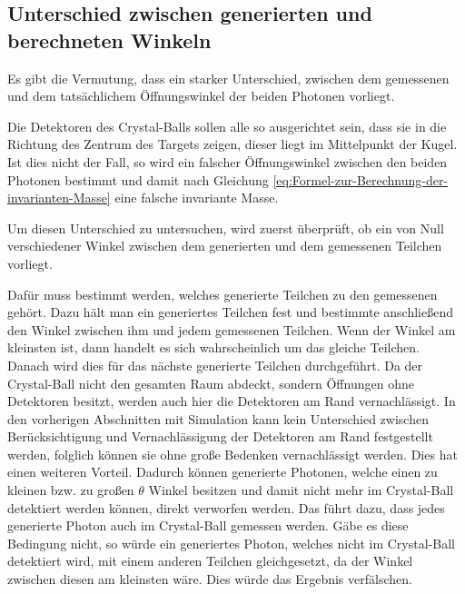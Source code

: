 \documentclass[a4paper,11pt,oneside,final,german,openbib,pdftex]{scrbook}
\begin{document}
{%




\subsection{Unterschied zwischen generierten und berechneten Winkeln}
\label{sec:Unterschied-tatsaechlicher-gemessener-Winkel}

Es gibt die Vermutung, dass ein starker Unterschied, zwischen dem gemessenen und dem tatsächlichem Öffnungswinkel der beiden Photonen vorliegt.

Die Detektoren des Crystal-Balls sollen alle so ausgerichtet sein, dass sie in die Richtung des Zentrum des Targets zeigen, dieser liegt im Mittelpunkt der Kugel. Ist dies nicht der Fall, so wird ein falscher Öffnungswinkel zwischen den beiden Photonen bestimmt und damit nach Gleichung \ref{eq:Formel-zur-Berechnung-der-invarianten-Masse} eine falsche invariante Masse.

Um diesen Unterschied zu untersuchen, wird zuerst überprüft, ob ein von Null verschiedener Winkel zwischen dem generierten und dem gemessenen Teilchen vorliegt.

Dafür muss bestimmt werden, welches generierte Teilchen zu den gemessenen gehört. Dazu h\"alt man ein generiertes Teilchen fest und bestimmte anschließend den Winkel zwischen ihm und jedem gemessenen Teilchen. Wenn der Winkel am kleinsten ist, dann handelt es sich wahrscheinlich um das gleiche Teilchen. Danach wird dies für das nächste generierte Teilchen durchgeführt. Da der Crystal-Ball nicht den gesamten Raum abdeckt, sondern \"Offnungen ohne Detektoren besitzt, werden auch hier die Detektoren am Rand vernachlässigt. In den vorherigen Abschnitten mit Simulation kann kein Unterschied zwischen Berücksichtigung und Vernachlässigung der Detektoren am Rand festgestellt werden, folglich k\"onnen sie ohne große Bedenken vernachlässigt werden. Dies hat einen weiteren Vorteil. Dadurch k\"onnen generierte Photonen, welche einen zu kleinen bzw. zu großen $\theta$ Winkel besitzen und damit nicht mehr im Crystal-Ball detektiert werden k\"onnen, direkt verworfen werden. Das führt dazu, dass jedes generierte Photon auch im Crystal-Ball gemessen werden. Gäbe es diese Bedingung nicht, so würde ein generiertes Photon, welches nicht im Crystal-Ball detektiert wird, mit einem anderen Teilchen gleichgesetzt, da der Winkel zwischen diesen am kleinsten wäre. Dies würde das Ergebnis verfälschen. 

}
\end{document}
